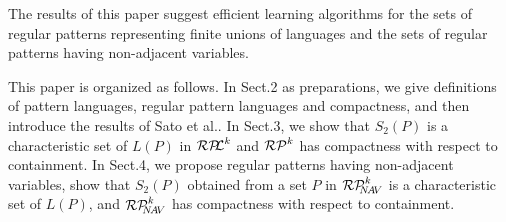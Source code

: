 The results of this paper suggest efficient learning algorithms for the sets of regular patterns representing finite unions of languages and the sets of regular patterns having non-adjacent variables.

This paper is organized as follows.
In Sect.2 as preparations, we give definitions of pattern languages, regular pattern languages and compactness, and then introduce the results of Sato et al.\cite{Sato1}.
In Sect.3, we show that $S_{2}(P)$ is a characteristic set of $L(P)$ in $\mathcal{RP\!\!L}^{k}$ and $\mathcal{RP}^{k}$ has compactness with respect to containment.
In Sect.4, we propose regular patterns having non-adjacent variables, show that $S_2(P)$ obtained from a set $P$ in $\mathcal{RP}^{k}_{\!\!\!N\!A\!V}$ is a characteristic set of $L(P)$, and $\mathcal{RP}^{k}_{\!\!\!N\!A\!V}$ has compactness with respect to containment.

